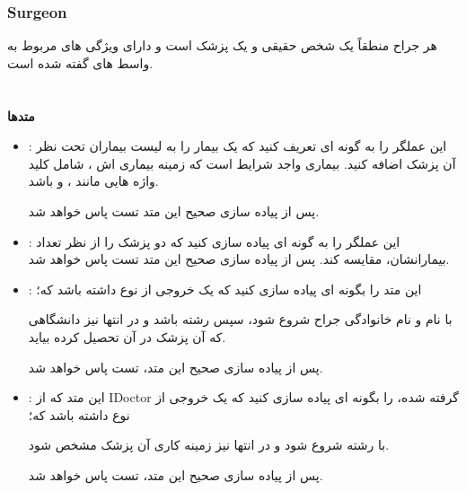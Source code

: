         \subsubsection{Surgeon}
        هر جراح منطقاً یک شخص حقیقی و یک پزشک است و دارای ویژگی های مربوط به 
        واسط های گفته شده
        است.
        \\
        \\
        \\
        \textbf{متدها}
        \begin{itemize}
        \item 
            \grayBox{\textcolor{orange}{Operator +}}
            :
            این عملگر را به گونه ای تعریف کنید که یک بیمار را به لیست بیماران تحت نظر آن پزشک اضافه کنید.
            بیماری واجد شرایط است که زمینه بیماری اش ، شامل 
            کلید واژه هایی مانند 
            \grayBox{\textcolor{red}{Cancer}}
            ،
            \grayBox{\textcolor{red}{Appendix}}
            و
            \grayBox{\textcolor{red}{Kidney}}
            باشد.
            
            پس از پیاده سازی صحیح این متد تست
            \grayBox{\textcolor{dkgreen}{AddingPatientsToSurgeon}}
            پاس خواهد شد.
        \item 
            \grayBox{\textcolor{orange}{Operator > / <}}
            :
            این عملگر را به گونه ای پیاده سازی کنید که دو پزشک را از نظر تعداد بیمارانشان، مقایسه کند.
            پس از پیاده سازی صحیح این متد تست
            \grayBox{\textcolor{dkgreen}{CompareSurgeons}}
            پاس خواهد شد.
        \item
            \grayBox{\textcolor{orange}{GraduatedFrom}}
            :
            این متد را بگونه ای پیاده سازی کنید که یک خروجی از نوع 
            \grayBox{\textcolor{blue}{string}}
            داشته باشد که؛
            
            با نام و نام خانوادگی جراح شروع شود، سپس رشته 
            باشد و در انتها نیز دانشگاهی که آن پزشک در آن تحصیل کرده بیاید.
            
            پس از پیاده سازی صحیح این متد، تست
            \grayBox{\textcolor{dkgreen}{GraduatingSurgeons}}
            پاس خواهد شد.
            
        \item
            \grayBox{\textcolor{orange}{Work}}
            :
            این متد 
            که از
            IDoctor
            گرفته شده،
            را بگونه ای پیاده سازی کنید که یک خروجی از نوع 
            \grayBox{\textcolor{blue}{string}}
            داشته باشد که؛
            
            با رشته
            شروع شود و در انتها نیز زمینه کاری آن پزشک مشخص شود.
            
            پس از پیاده سازی صحیح این متد، تست
            \grayBox{\textcolor{dkgreen}{WorkingSurgeons}}
            پاس خواهد شد.
        \end{itemize}
        
